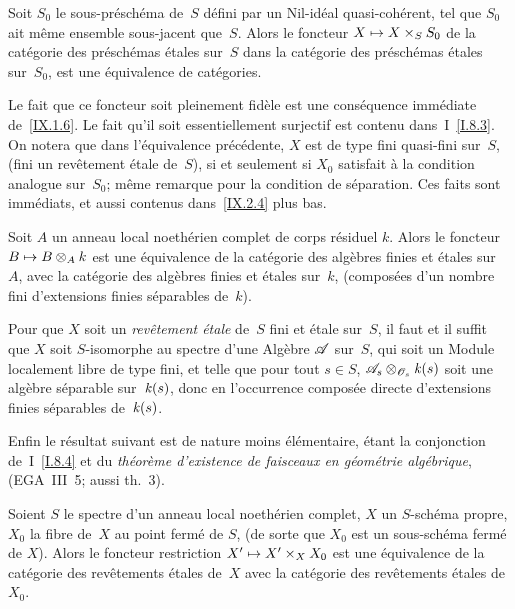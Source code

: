 \begin{proposition}
\label{IX.1.7}
Soit $S_0$ le sous-pr\'esch\'ema de~$S$ d\'efini par un
Nil-id\'eal quasi-coh\'erent, \ie tel que $S_0$ ait m\^eme
ensemble sous-jacent que~$S$. Alors le foncteur $X \mto X\times_S
S_0$ de la cat\'egorie des pr\'esch\'emas \'etales sur~$S$
dans la cat\'egorie des pr\'esch\'emas \'etales sur~$S_0$, est
une \'equivalence de cat\'egories.
\end{proposition}

Le fait que ce foncteur soit pleinement fid\`ele est une
cons\'equence imm\'ediate de~\ref{IX.1.6}. Le fait qu'il soit
essentiellement surjectif est contenu dans~I~\ref{I.8.3}. On notera
que dans l'\'equivalence pr\'ec\'edente,
$X$ est de type fini \ie quasi-fini sur~$S$, (\resp fini \ie un rev\^etement \'etale
de~$S$), si et seulement si $X_0$ satisfait \`a la condition
analogue sur~$S_0$; m\^eme remarque pour la condition de
s\'eparation. Ces faits sont imm\'ediats, et aussi contenus
dans~\ref{IX.2.4} plus bas.

\begin{corollaire}
\label{IX.1.8}
Soit $A$ un anneau local noeth\'erien complet de corps r\'esiduel
$k$. Alors le foncteur $B \mto B\otimes_A k$ est une
\'equivalence de la cat\'egorie des alg\`ebres finies et
\'etales sur~$A$, avec la cat\'egorie des alg\`ebres finies et
\'etales sur~$k$, (\ie compos\'ees d'un nombre fini d'extensions
finies s\'eparables de~$k$).
\end{corollaire}

\begin{proposition}
\label{IX.1.9}
Pour que $X$ soit un \emph{revêtement étale} de~$S$ \ie fini
et \'etale sur~$S$, il faut et il suffit que $X$ soit $S$-isomorphe
au spectre d'une Alg\`ebre $\cal{A}$ sur~$S$, qui soit un Module
localement libre de type fini, et telle que pour tout
$s \in S$, $\cal{A}_s\otimes_{\cal{O}_s}\kres(s)$ soit une alg\`ebre
s\'eparable sur~$\mathit{k}(s)$, donc en l'occurrence compos\'ee directe
d'extensions finies s\'eparables de~$\mathit{k}(s)$.
\end{proposition}

Enfin le r\'esultat suivant est de nature moins \'el\'ementaire,
\'etant la conjonction de~I~\ref{I.8.4} et du
\emph{théorème d'existence de faisceaux en géométrie
algébrique}, (EGA~III~5; \cf aussi \cite{IX.1} th.\, 3).

\begin{theoreme}
\label{IX.1.10}
Soient $S$ le spectre d'un anneau local noeth\'erien complet, $X$ un
$S$-sch\'ema propre, $X_0$ la fibre de~$X$ au point ferm\'e de
$S$, (de sorte que $X_0$ est un sous-sch\'ema ferm\'e de
$X$). Alors le foncteur restriction $X' \mto X'\times_X X_0$ est
une \'equivalence de la cat\'egorie des rev\^etements \'etales
de~$X$ avec la cat\'egorie des rev\^etements \'etales de~$X_0$.
\end{theoreme}

